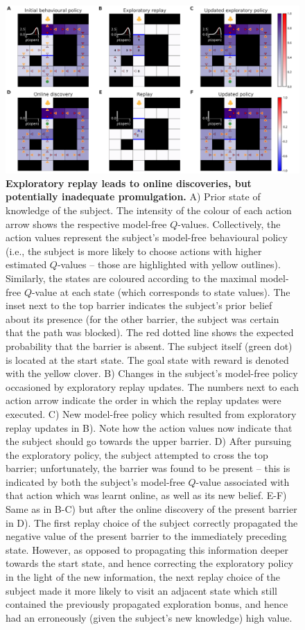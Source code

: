 \begin{figure}[h!]
    \centering
    \includegraphics[width=1\textwidth]{Figures/fig2.png}
    \caption{\footnotesize \textbf{Exploratory replay leads to online discoveries, but potentially inadequate promulgation.} A) Prior state of knowledge of the subject. The intensity of the colour of each action arrow shows the respective model-free $Q$-values. Collectively, the action values represent the subject's model-free behavioural policy (i.e., the subject is more likely to choose actions with higher estimated $Q$-values -- those are highlighted with yellow outlines). Similarly, the states are coloured according to the maximal model-free $Q$-value at each state (which corresponds to state values). The inset next to the top barrier indicates the subject's prior belief about its presence (for the other barrier, the subject was certain that the path was blocked). The red dotted line shows the expected probability that the barrier is absent. The subject itself (green dot) is located at the start state. The goal state with reward is denoted with the yellow clover. B) Changes in the subject's model-free policy occasioned by exploratory replay updates. The numbers next to each action arrow indicate the order in which the replay updates were executed. C) New model-free policy which resulted from exploratory replay updates in B). Note how the action values now indicate that the subject should go towards the upper barrier. D) After pursuing the exploratory policy, the subject attempted to cross the top barrier; unfortunately, the barrier was found to be present -- this is indicated by both the subject's model-free $Q$-value associated with that action which was learnt online, as well as its new belief. E-F) Same as in B-C) but after the online discovery of the present barrier in D). The first replay choice of the subject correctly propagated the negative value of the present barrier to the immediately preceding state. However, as opposed to propagating this information deeper towards the start state, and hence correcting the exploratory policy in the light of the new information, the next replay choice of the subject made it more likely to visit an adjacent state which still contained the previously propagated exploration bonus, and hence had an erroneously (given the subject's new knowledge) high value.}
    \label{fig:fig2}
\end{figure}

